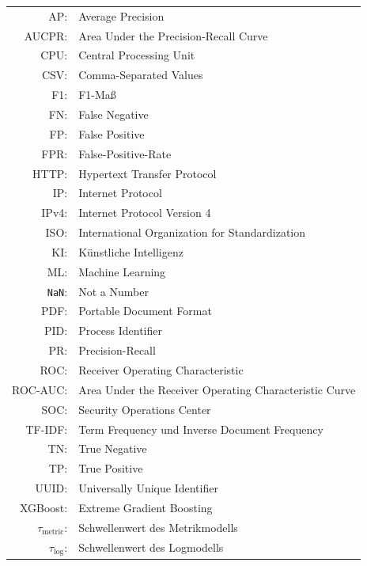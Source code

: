\documentclass[serif,article,parskip,de]{agse-thesis}
\begin{document}
\begin{tabular}{@{}r@{\quad}l@{}}
  AP:     & Average Precision \\
  AUCPR:  & Area Under the Precision-Recall Curve \\
  CPU:    & Central Processing Unit \\
  CSV:    & Comma-Separated Values \\
  F1:     & F1-Maß \\
  FN:     & False Negative \\
  FP:     & False Positive \\
  FPR:    & False-Positive-Rate \\
  HTTP:   & Hypertext Transfer Protocol \\
  IP:     & Internet Protocol \\
  IPv4:   & Internet Protocol Version 4 \\
  ISO:    & International Organization for Standardization \\
  KI:     & Künstliche Intelligenz \\
  ML:     & Machine Learning \\
  \texttt{NaN}: & Not a Number \\
  PDF:    & Portable Document Format \\
  PID:    & Process Identifier \\
  PR:     & Precision-Recall \\
  ROC:    & Receiver Operating Characteristic \\
  ROC-AUC: & Area Under the Receiver Operating Characteristic Curve \\
  SOC:    & Security Operations Center \\
  TF-IDF: & Term Frequency und Inverse Document Frequency \\
  TN:     & True Negative \\
  TP:     & True Positive \\
  UUID:   & Universally Unique Identifier \\
  XGBoost: & Extreme Gradient Boosting \\
  $\tau_{\text{metric}}$: & Schwellenwert des Metrikmodells \\
  $\tau_{\text{log}}$:    & Schwellenwert des Logmodells \\
\end{tabular}

\clearpage

\pagestyle{fancy}







\printbibliography

\appendix

\end{document}
